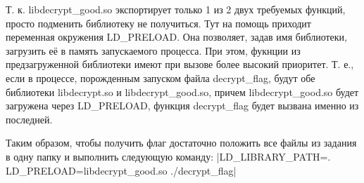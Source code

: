 Т. к. libdecrypt\_good.so экспортирует только 1 из 2 двух требуемых функций, просто подменить библиотеку не получиться. Тут на помощь приходит переменная окружения LD\_PRELOAD. Она позволяет, задав имя библиотеки, загрузить её в память запускаемого процесса. При этом, фукнции из предзагруженной библиотеки имеют при вызове более высокий приоритет. Т. е., если в процессе, порожденным запуском файла decrypt\_flag, будут обе библиотеки libdecrypt.so и libdecrypt\_good.so, причем libdecrypt\_good.so будет загружена через LD\_PRELOAD, функция \linebreak decrypt\_flag будет вызвана именно из последней.

Таким образом, чтобы получить флаг достаточно положить все файлы из задания в одну папку и выполнить следующую команду:
|LD_LIBRARY_PATH=. LD_PRELOAD=libdecrypt_good.so ./decrypt_flag|

